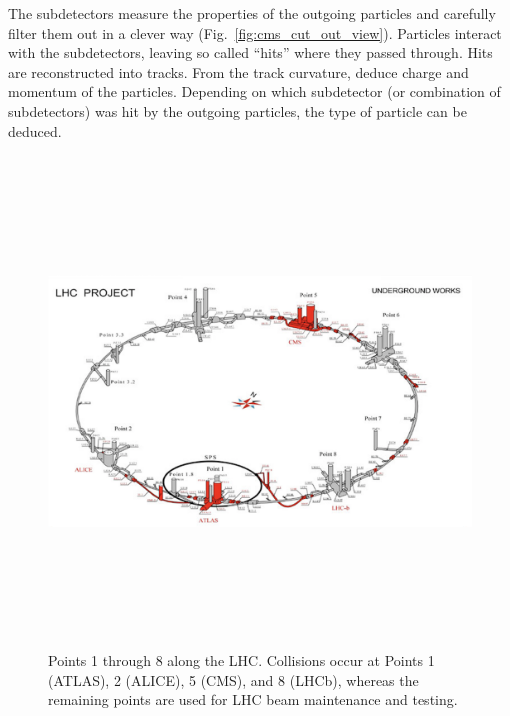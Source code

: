 The subdetectors measure the properties of the outgoing particles and carefully filter them out in a clever way (Fig.~\ref{fig:cms_cut_out_view}).
Particles interact with the subdetectors, leaving so called ``hits'' where they passed through.
Hits are reconstructed into tracks.
From the track curvature, deduce charge and momentum of the particles.
Depending on which subdetector (or combination of subdetectors) was hit by the outgoing particles, the type of particle can be deduced.
\begin{figure}[pbth]
\centering
\includegraphics[width=13cm,height=13cm,keepaspectratio]{figures/cms/lhc_points_with_buildings.png}
    \caption{
    Points 1 through 8 along the LHC.
    Collisions occur at 
    Points 1 (ATLAS), 2 (ALICE), 5 (CMS), and 8 (LHCb),
    whereas the remaining points are used for LHC beam maintenance and testing.} 
    \label{fig:lhc_points}
\end{figure}

